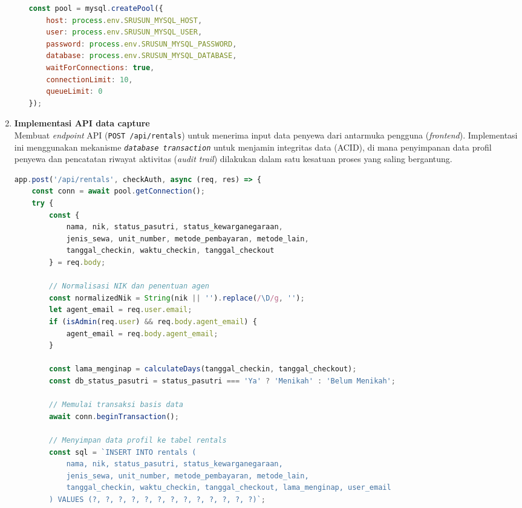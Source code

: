\begin{enumerate}
\begin{enumerate}
\begin{lstlisting}[language=JavaScript, caption={Konfigurasi \textit{Connection Pool} Basis Data}]
const pool = mysql.createPool({
    host: process.env.SRUSUN_MYSQL_HOST,
    user: process.env.SRUSUN_MYSQL_USER,
    password: process.env.SRUSUN_MYSQL_PASSWORD,
    database: process.env.SRUSUN_MYSQL_DATABASE,
    waitForConnections: true,
    connectionLimit: 10,
    queueLimit: 0
});
        \end{lstlisting}
    \end{enumerate}
        
    \item \textbf{Implementasi API {data capture}} \\
    Membuat \textit{endpoint} API (\texttt{POST /api/rentals}) untuk menerima input data penyewa dari antarmuka pengguna (\textit{frontend}). Implementasi ini menggunakan mekanisme \texttt{\textit{database transaction}} untuk menjamin integritas data (ACID), di mana penyimpanan data profil penyewa dan pencatatan riwayat aktivitas (\textit{audit trail}) dilakukan dalam satu kesatuan proses yang saling bergantung.

    \begin{lstlisting}[language=JavaScript, caption={Implementasi Transaksi API Data Capture}]
app.post('/api/rentals', checkAuth, async (req, res) => {
    const conn = await pool.getConnection();
    try {
        const {
            nama, nik, status_pasutri, status_kewarganegaraan, 
            jenis_sewa, unit_number, metode_pembayaran, metode_lain, 
            tanggal_checkin, waktu_checkin, tanggal_checkout
        } = req.body;

        // Normalisasi NIK dan penentuan agen
        const normalizedNik = String(nik || '').replace(/\D/g, '');
        let agent_email = req.user.email;
        if (isAdmin(req.user) && req.body.agent_email) {
            agent_email = req.body.agent_email;
        }

        const lama_menginap = calculateDays(tanggal_checkin, tanggal_checkout);
        const db_status_pasutri = status_pasutri === 'Ya' ? 'Menikah' : 'Belum Menikah';

        // Memulai transaksi basis data
        await conn.beginTransaction();

        // Menyimpan data profil ke tabel rentals
        const sql = `INSERT INTO rentals (
            nama, nik, status_pasutri, status_kewarganegaraan, 
            jenis_sewa, unit_number, metode_pembayaran, metode_lain, 
            tanggal_checkin, waktu_checkin, tanggal_checkout, lama_menginap, user_email
        ) VALUES (?, ?, ?, ?, ?, ?, ?, ?, ?, ?, ?, ?, ?)`;


\end{lstlisting}
\end{enumerate}
